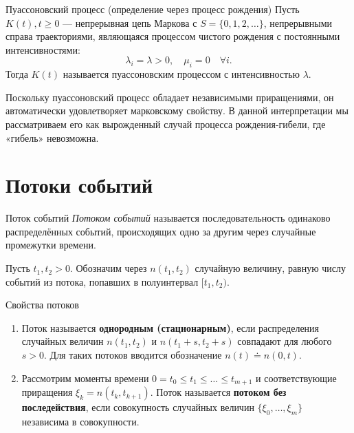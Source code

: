 \begin{definition}{Пуассоновский процесс (определение через процесс рождения)}
    Пусть $K(t), t \ge 0$ — непрерывная цепь Маркова с $S = \{0, 1, 2, \dots \}$, непрерывными справа траекториями, являющаяся процессом чистого рождения с постоянными интенсивностями:
    \begin{equation}
        \lambda_i = \lambda > 0, \quad \mu_i = 0 \quad \forall i.
    \end{equation}
    Тогда $K(t)$ называется пуассоновским процессом с интенсивностью $\lambda$.
\end{definition}

\begin{note}
    Поскольку пуассоновский процесс обладает независимыми приращениями, он автоматически удовлетворяет марковскому свойству. В данной интерпретации мы рассматриваем его как вырожденный случай процесса рождения-гибели, где «гибель» невозможна.
\end{note}

\section{Потоки событий}

\begin{definition}{Поток событий}
    \textit{Потоком событий} называется последовательность одинаково распределённых событий, происходящих одно за другим через случайные промежутки времени.
\end{definition}

\begin{center}
\end{center}

Пусть $t_1, t_2 > 0$. Обозначим через $n(t_1, t_2)$ случайную величину, равную числу событий из потока, попавших в полуинтервал $[t_1, t_2)$.

\begin{definition}{Свойства потоков}
    \begin{enumerate}
        \item Поток называется \textbf{однородным (стационарным)}, если распределения случайных величин $n(t_1, t_2)$ и $n(t_1 + s, t_2 + s)$ совпадают для любого $s > 0$. Для таких потоков вводится обозначение $n(t) \doteq n(0, t)$.
        \item Рассмотрим моменты времени $0 = t_0 \le t_1 \le \dots \le t_{m+1}$ и соответствующие приращения $\xi_k = n(t_k, t_{k+1})$. Поток называется \textbf{потоком без последействия}, если совокупность случайных величин $\{\xi_0, \dots, \xi_m \}$ независима в совокупности.
    \end{enumerate}
\end{definition}



